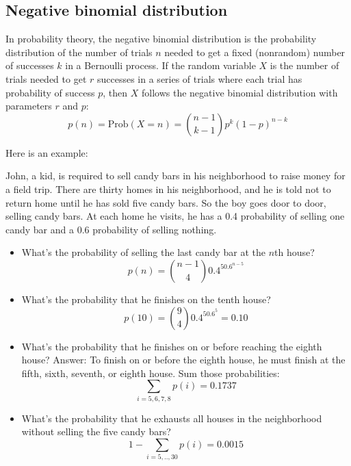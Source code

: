 \documentclass[justified, sixbynine]{tufte-book}
\theoremstyle{plain}%
\newtheorem * {corollary}{Corollary}
\theoremstyle{definition}
\theoremstyle{remark}
\newtheorem * {remark}{Remark}
\newtheorem * {note}{Note}
\begin{document}
\begin{fullwidth}
\goodbreak\subsection{Negative binomial distribution}

In probability theory, the negative binomial distribution is the probability
distribution of the number of trials $n$ needed to get a fixed
(nonrandom) number of successes $k$ in a Bernoulli process. If the random
variable $X$ is the number of trials needed to get $r$ successes in a series of
trials where each trial has probability of success $p$, then $X$ follows the
negative binomial distribution with parameters $r$ and $p$:
\begin{equation}
p(n)=\textrm{Prob}(X=n)=\binom{n-1}{k-1}p^k(1-p)^{n-k}
\end{equation}

Here is an example:

John, a kid, is required to sell candy bars in his neighborhood to
raise money for a field trip. There are thirty homes in his
neighborhood, and he is told not to return home until he has sold five candy bars.
So the boy goes door to door, selling candy bars. At each home he visits, he
has a 0.4 probability of selling one candy bar and a 0.6 probability of
selling nothing.

\begin{itemize}
\item  What's the probability of selling the last candy bar at the $n$th house?
\begin{equation}
p(n)=\binom{n-1}40.4^50.6^{n-5}
\end{equation}

\item  What's the probability that he finishes on the tenth house?
\begin{equation}
p(10)=\binom 940.4^50.6^5=0.10
\end{equation}

\item  What's the probability that he finishes on or before reaching the
eighth house? Answer: To finish on or before the eighth house, he must
finish at the fifth, sixth, seventh, or eighth house. Sum those
probabilities:
\begin{equation}
\sum_{i=5, 6, 7, 8}p(i)=0.1737
\end{equation}

\item  What's the probability that he exhausts all houses in the
neighborhood without selling the five candy bars?
\begin{equation}
1-\sum_{i=5, .., 30}p(i)=0.0015
\end{equation}
\end{itemize}


\end{fullwidth}
\end{document}
